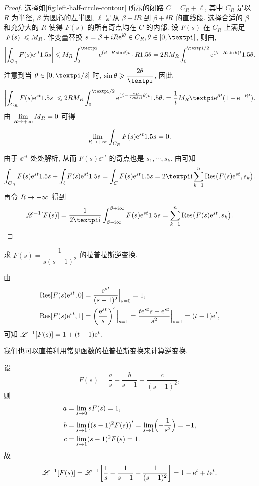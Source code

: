 \begin{proof}
  选择如\ref{fig:left-half-circle-contour} 所示的闭路 $C=C_R+\ell$, 其中 $C_R$ 是以 $R$ 为半径, $\beta$ 为圆心的左半圆, $\ell$ 是从 $\beta-\ii R$ 到 $\beta+\ii R$ 的直线段.
  选择合适的 $\beta$ 和充分大的 $R$ 使得 $F(s)$ 的所有奇点均在 $C$ 的内部.
  设 $F(s)$ 在 $C_R$ 上满足 $\lvert F(s)\rvert\leqslant M_R$.
  作变量替换 $s=\beta+iR\ee^{\ii\theta}\in C_R,\theta\in[0,\cpi]$, 则由\thmGrowUp,
  \[
     \biggabs{\int_{C_R} F(s)\ee^{st}\d s}
    \le M_R \int_0^\cpi \ee^{(\beta-R\sin \theta)t} \cdot R\d \theta
    =2RM_R\int_0^{\cpi/2}\ee^{(\beta-R\sin \theta)t}\d \theta.
  \]
  注意到当 $\theta\in[0,\cpi/2]$ 时, $\sin\theta\ge \dfrac{2\theta}\cpi$, 因此
  \[
     \biggabs{\int_{C_R} F(s)\ee^{st}\d s}
    \le2RM_R\int_0^{\cpi/2}\ee^{(\beta-\frac{2R}{\cpi}\theta)t}\d \theta.
    =\frac1tM_R\cpi\ee^{\beta t}(1-\ee^{-Rt}).
  \]
  由 $\lim\limits_{R\rightarrow+\infty} M_R=0$ 可得
  \[
    \lim_{R\rightarrow+\infty} \int_{C_R} F(s)\mathrm{e}^{st}1.5 s=0.
  \]

  由于 $\ee^{st}$ 处处解析, 从而 $F(s)\ee^{st}$ 的奇点也是 $s_1,\cdots,s_k$.
  由\thmRes 可知
  \[
    \int_{C_R} F(s)\ee^{st}\d s+\int_\ell F(s)\ee^{st}\d s
    =\int_C F(s)\ee^{st}\d s
    =2\cpi\ii\sum_{k=1}^n\Res\bigl(F(s)\ee^{st},s_k\bigr).
  \]
  再令 $R\rightarrow+\infty$ 得到
  \[
     \msl^{-1}[F(s)]
    =\frac1{2\cpi\ii}\int_{\beta-\ii\infty}^{\beta+\ii\infty} F(s)\ee^{st}\d s
    =\sum_{k=1}^n\Res\bigl(F(s)\ee^{st},s_k\bigr).
    \qedhere
  \]
\end{proof}

\begin{example}
  求 $F(s)=\dfrac1{s(s-1)^2}$ 的拉普拉斯逆变换.
\end{example}

\begin{solution}[解法一]
  由
  \begin{align*}
     {\mathrm{Res}}[F(s)\mathrm{e}^{st},0]
    &=\frac{\mathrm{e}^{st}}{(s-1)^2}\Big|_{s=0}
     =1,\\
     {\mathrm{Res}}[F(s)\mathrm{e}^{st},1]
    &=\left(\frac{\mathrm{e}^{st}}s\right)'\Big|_{s=1}
     =\frac{t\mathrm{e}^{st}s-\mathrm{e}^{st}}{s^2}\Big|_{s=1}
     =(t-1)\mathrm{e}^t,
  \end{align*}
  可知 $\mathscr{L}^{-1}[F(s)]=1+(t-1)\mathrm{e}^t$.
\end{solution}

我们也可以直接利用常见函数的拉普拉斯变换来计算逆变换.

\begin{solution}[解法二]
  设
  \[
    F(s)=\frac as+\frac b{s-1}+\frac c{(s-1)^2},
  \]
  则
  \begin{align*}
    a&=\lim_{s\rightarrow0}sF(s)
      =1,\\
    b&=\lim_{s\rightarrow1}\bigl((s-1)^2F(s)\bigr)'
      =\lim_{s\rightarrow1}\Bigl(-\frac1{s^2}\Bigr)
      =-1,\\
    c&=\lim_{s\rightarrow1}(s-1)^2F(s)
      =1.
  \end{align*}
  故
  \[
     \mathscr{L}^{-1}[F(s)]
    =\mathscr{L}^{-1}\biggl[\frac1s-\frac1{s-1}+\frac1{(s-1)^2}\biggr]
    =1-\mathrm{e}^t+t\mathrm{e}^t.
  \]
\end{solution}

